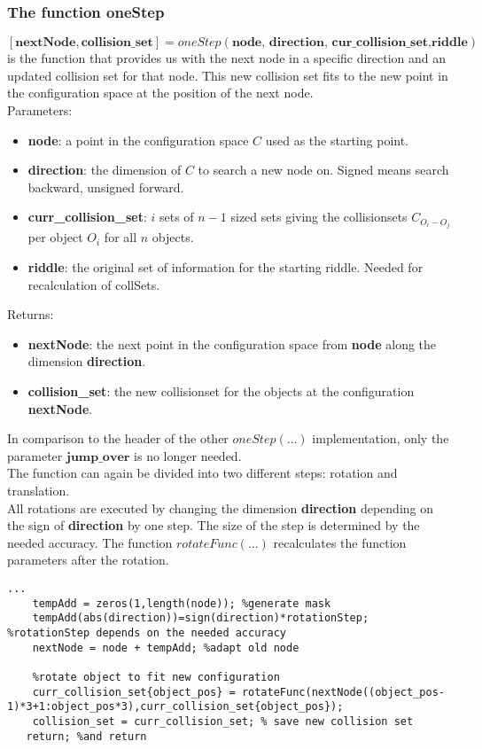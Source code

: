 \subsubsection{The function oneStep}
$[\textbf{nextNode}, \textbf{collision\_set} ]=oneStep(\textbf{node, direction, cur\_collision\_set,riddle})$ is the function that provides us with the next node in a specific direction and an updated collision set for that node. This new collision set fits to the new point in the configuration space at the position of the next node.\\
Parameters:
\begin{itemize}
\item \textbf{node}: a point in the configuration space $C$ used as the starting point.
\item \textbf{direction}: the dimension of $C$ to search a new node on. Signed means search backward, unsigned forward. 
\item \textbf{curr\_collision\_set}: $i$ sets of $n-1$ sized sets giving the collisionsets $C_{O_i-O_j}$ per object $O_i$ for all $n$ objects.
\item \textbf{riddle}: the original set of information for the starting riddle. Needed for recalculation of collSets.
\end{itemize}
Returns:
\begin{itemize}
\item \textbf{nextNode}: the next point in the configuration space from \textbf{node} along the dimension \textbf{direction}.
\item \textbf{collision\_set}: the new collisionset for the objects at the configuration \textbf{nextNode}.
\end{itemize}
In comparison to the header of the other $oneStep(...)$ implementation, only the parameter $\textbf{jump\_over}$ is no longer needed.\\
The function can again be divided into two different steps: rotation and translation.\\
All rotations are executed by changing the dimension \textbf{direction}  depending on the sign of \textbf{direction} by one step. The size of the step is determined 
by the needed accuracy. The function $rotateFunc(...)$ recalculates the function parameters after the rotation. \\
\begin{lstlisting}
...
    tempAdd = zeros(1,length(node)); %generate mask
    tempAdd(abs(direction))=sign(direction)*rotationStep; %rotationStep depends on the needed accuracy
    nextNode = node + tempAdd; %adapt old node
    
    %rotate object to fit new configuration
    curr_collision_set{object_pos} = rotateFunc(nextNode((object_pos-1)*3+1:object_pos*3),curr_collision_set{object_pos}); 
    collision_set = curr_collision_set; % save new collision set
   return; %and return
\end{lstlisting}
